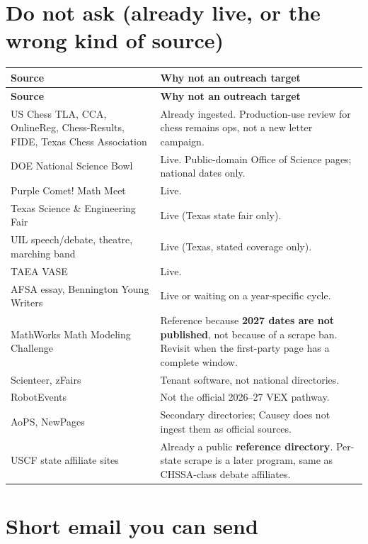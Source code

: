 \documentclass[11pt]{article}
\begin{document}
\section*{Do not ask (already live, or the wrong kind of source)}

{\small
\begin{longtable}{@{}L{0.38\textwidth} L{0.58\textwidth}@{}}
\toprule
\textbf{Source} & \textbf{Why not an outreach target} \\
\midrule
\endfirsthead
\toprule
\textbf{Source} & \textbf{Why not an outreach target} \\
\midrule
\endhead
\bottomrule
\endlastfoot
US Chess TLA, CCA, OnlineReg, Chess-Results, FIDE, Texas Chess Association
  & Already ingested. Production-use review for chess remains ops, not a new letter campaign. \\[0.35em]
DOE National Science Bowl
  & Live. Public-domain Office of Science pages; national dates only. \\[0.35em]
Purple Comet! Math Meet
  & Live. \\[0.35em]
Texas Science \& Engineering Fair
  & Live (Texas state fair only). \\[0.35em]
UIL speech/debate, theatre, marching band
  & Live (Texas, stated coverage only). \\[0.35em]
TAEA VASE
  & Live. \\[0.35em]
AFSA essay, Bennington Young Writers
  & Live or waiting on a year-specific cycle. \\[0.35em]
MathWorks Math Modeling Challenge
  & Reference because \textbf{2027 dates are not published}, not because of a scrape ban. Revisit when the first-party page has a complete window. \\[0.35em]
Scienteer, zFairs
  & Tenant software, not national directories. \\[0.35em]
RobotEvents
  & Not the official 2026--27 VEX pathway. \\[0.35em]
AoPS, NewPages
  & Secondary directories; Causey does not ingest them as official sources. \\[0.35em]
USCF state affiliate sites
  & Already a public \textbf{reference directory}. Per-state scrape is a later program, same as CHSSA-class debate affiliates. \\
\end{longtable}
}

\section*{Short email you can send}
\end{document}
